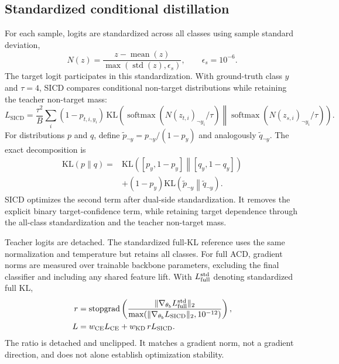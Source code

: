 \documentclass[10pt]{article}
\newcommand{\SICD}{\mathrm{SICD}}
\newcommand{\KL}{\mathrm{KL}}
\begin{document}
\subsection{Standardized conditional distillation}
For each sample, logits are standardized across all classes using sample standard deviation,
\begin{equation}
N(z)=\frac{z-\operatorname{mean}(z)}{\max(\operatorname{std}(z),\epsilon_s)},\qquad \epsilon_s=10^{-6}.
\end{equation}
The target logit participates in this standardization. With ground-truth class $y$ and $\tau=4$, SICD compares conditional non-target distributions while retaining the teacher non-target mass:
\begin{equation}
L_{\SICD}=\frac{\tau^2}{B}\sum_i(1-p_{t,i,y_i})\,\KL\!\left(\operatorname{softmax}(N(z_{t,i})_{\neg y_i}/\tau)\middle\|\operatorname{softmax}(N(z_{s,i})_{\neg y_i}/\tau)\right).
\end{equation}
For distributions $p$ and $q$, define $\widetilde p_{\neg y}=p_{\neg y}/(1-p_y)$ and analogously $\widetilde q_{\neg y}$. The exact decomposition is
\begin{align}
\KL(p\|q)={}&\KL\!\left([p_y,1-p_y]\middle\|[q_y,1-q_y]\right)\\
&+(1-p_y)\KL\!\left(\widetilde p_{\neg y}\middle\|\widetilde q_{\neg y}\right).
\end{align}
SICD optimizes the second term after dual-side standardization. It removes the explicit binary target-confidence term, while retaining target dependence through the all-class standardization and the teacher non-target mass.

Teacher logits are detached. The standardized full-KL reference uses the same normalization and temperature but retains all classes. For full ACD, gradient norms are measured over trainable backbone parameters, excluding the final classifier and including any shared feature lift. With $L_{\rm full}^{\rm std}$ denoting standardized full KL,
\begin{align}
r&=\operatorname{stopgrad}\left(\frac{\lVert\nabla_{\theta_b}L_{\rm full}^{\rm std}\rVert_2}{\max(\lVert\nabla_{\theta_b}L_{\SICD}\rVert_2,10^{-12})}\right),\\
L&=w_{\rm CE}L_{\rm CE}+w_{\rm KD}\,rL_{\SICD}.
\end{align}
The ratio is detached and unclipped. It matches a gradient norm, not a gradient direction, and does not alone establish optimization stability.
\end{document}

